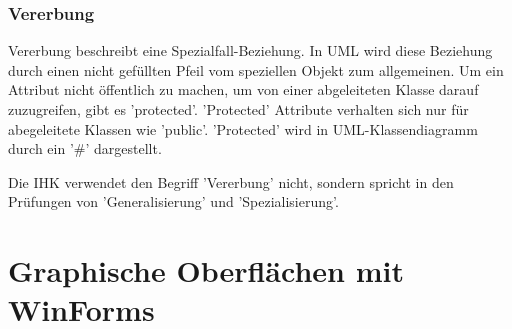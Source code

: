 \subsubsection{Vererbung}

Vererbung beschreibt eine Spezialfall-Beziehung. In UML wird diese Beziehung durch einen nicht gefüllten Pfeil vom speziellen Objekt zum allgemeinen. Um ein Attribut nicht öffentlich zu machen, um von einer abgeleiteten Klasse darauf zuzugreifen, gibt es 'protected'. 'Protected' Attribute verhalten sich nur für abegeleitete Klassen wie 'public'. 'Protected' wird in UML-Klassendiagramm durch ein '#' dargestellt.

Die IHK verwendet den Begriff 'Vererbung' nicht, sondern spricht in den Prüfungen von 'Generalisierung' und 'Spezialisierung'.

\section{Graphische Oberflächen mit WinForms}

